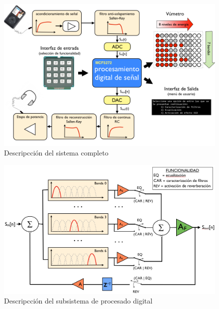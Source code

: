 \documentclass[a4paper,12pt]{article}
\begin{document}
\begin{figure}[hbt]
\includegraphics[width=\textwidth]{img/system_description.png} 
\caption{Descripcción del sistema completo} \label{fig:sysdesc}
\end{figure}

\begin{figure}[hbt]
\includegraphics[width=\textwidth]{img/digital_proc.png} 
\caption{Descripcción del subsistema de procesado digital} \label{fig:digproc}
\end{figure}
\end{document}
